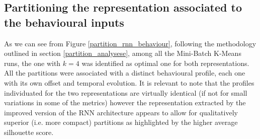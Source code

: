 \subsection{Partitioning the representation associated to the behavioural inputs}
\label{partition_behaviour}
As we can see from Figure \ref{partition_rnn_behaviour}, following the methodology outlined in section \ref{partition_analysese}, among all the Mini-Batch K-Means runs, the one with $k=4$ was identified as optimal one for both representations. All the partitions were associated with a distinct behavioural profile, each one with its own offset and temporal evolution. It is relevant to note that the profiles individuated for the two representations are virtually identical (if not for small variations in some of the metrics) however the representation extracted by the improved version of the RNN architecture appears to allow for qualitatively superior (i.e. more compact) partitions as highlighted by the higher average silhouette score.

